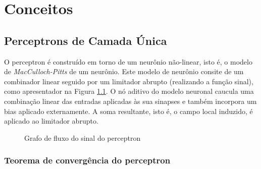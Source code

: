 \chapter{Conceitos}
\label{cap:conceitos}


\section{Perceptrons de Camada Única}
\label{sec:fundamentos}

  O perceptron é construído em torno de um neurônio não-linear, isto é, o modelo de \textit{MacCulloch-Pitts} de um neurônio. Este modelo de neurônio consite de um combinador linear seguido por um limitador abrupto (realizando a função sinal), como apresentador na Figura \ref{sec:perceptron:model}. O nó aditivo do modelo neuronal caucula uma combinação linear das entradas aplicadas às sua sinapses e também incorpora um bias aplicado externamente. A soma resultante, isto é, o campo local induzido, é aplicado ao limitador abrupto.

\begin{figure}[!htpb] 
  \caption{Grafo de fluxo do sinal do perceptron}
  \label{sec:perceptron:model}
\end{figure}

\subsection{ Teorema de convergência do perceptron}

